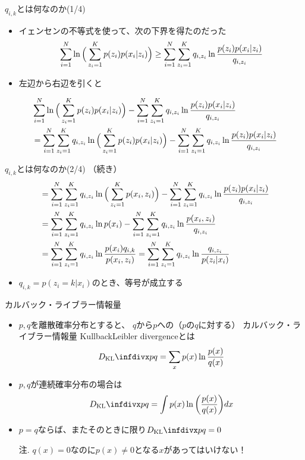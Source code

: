 \documentclass[aspectratio=169,unicode,dvipdfmx,14pt]{beamer}
\begin{document}
\begin{frame}{$q_{i,k}$とは何なのか(1/4)}
\begin{itemize}
\item イェンセンの不等式を使って、次の下界を得たのだった
\begin{align}
\sum_{i=1}^N \ln \Big( \sum_{z_i=1}^K p(z_i) p(x_i | z_i) \Big)
\geq 
\sum_{i=1}^N \sum_{z_i=1}^K q_{i,z_i} \ln\frac{p(z_i) p(x_i | z_i)}{q_{i,z_i}}
\notag
\end{align}
\item 左辺から右辺を引くと
\end{itemize}
\begin{align}
& \sum_{i=1}^N \ln \Big( \sum_{z_i=1}^K p(z_i) p(x_i | z_i) \Big)
- \sum_{i=1}^N \sum_{z_i=1}^K q_{i,z_i} \ln\frac{p(z_i) p(x_i | z_i)}{q_{i,z_i}}
\notag \\ &
= \sum_{i=1}^N \sum_{z_i=1}^K q_{i,z_i} \ln \Big( \sum_{z_i=1}^K p(z_i) p(x_i | z_i) \Big)
- \sum_{i=1}^N \sum_{z_i=1}^K q_{i,z_i} \ln\frac{p(z_i) p(x_i | z_i)}{q_{i,z_i}}
\notag
\end{align}
\end{frame}

\begin{frame}{$q_{i,k}$とは何なのか(2/4)}
（続き）
\begin{align}
&
= \sum_{i=1}^N \sum_{z_i=1}^K q_{i,z_i} \ln \Big( \sum_{z_i=1}^K p(x_i, z_i) \Big)
- \sum_{i=1}^N \sum_{z_i=1}^K q_{i,z_i} \ln\frac{p(z_i) p(x_i | z_i)}{q_{i,z_i}}
\notag \\
& = \sum_{i=1}^N \sum_{z_i=1}^K q_{i,z_i} \ln p(x_i)
- \sum_{i=1}^N \sum_{z_i=1}^K q_{i,z_i} \ln\frac{p(x_i, z_i)}{q_{i,z_i}}
\notag \\& 
= \sum_{i=1}^N \sum_{z_i=1}^K q_{i,z_i} \ln \frac{p(x_i) q_{i,k}}{p(x_i , z_i)}
= \sum_{i=1}^N \sum_{z_i=1}^K q_{i,z_i} \ln \frac{q_{i,z_i}}{p(z_i | x_i)}
\label{eq:diff}
\end{align}
\begin{itemize}
\item $q_{i,k}=p(z_i = k| x_i)$のとき、等号が成立する
\end{itemize}
\end{frame}


\begin{frame}{カルバック・ライブラー情報量}
\begin{itemize}
\item $p,q$を離散確率分布とすると、
$q$から$p$への{\small（$p$の$q$に対する）}
カルバック・ライブラー情報量 {\small KullbackLeibler divergence}とは
\begin{align}
\infdiv{p}{q} = \sum_{x} p(x) \ln \frac{p(x)}{q(x)}
\end{align}
\item $p,q$が連続確率分布の場合は
\begin{align}
\infdiv{p}{q} = \int p(x) \ln \bigg( \frac{p(x)}{q(x)} \bigg) dx
\end{align}
\item $p=q$ならば、またそのときに限り$\infdiv{p}{q} = 0$
\item[注.] $q(x) = 0$なのに$p(x) \neq 0$となる$x$があってはいけない！
\end{itemize}
\end{frame}
\end{document}
